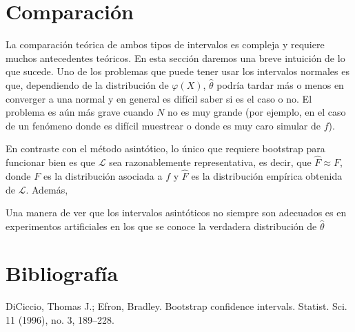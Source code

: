 \documentclass[11pt]{article}
\newcommand\LL{\mathcal{L}}
\begin{document}
\section*{Comparación}

La comparación teórica de ambos tipos de intervalos es compleja y requiere muchos antecedentes teóricos. En esta sección daremos una breve intuición de lo que sucede. Uno de los problemas que puede tener usar los intervalos normales es que, dependiendo de la distribución de $\varphi(X)$, $\hat\theta$ podría tardar más o menos en converger a una normal y en general es difícil saber si es el caso o no. El problema es aún más grave cuando $N$ no es muy grande (por ejemplo, en el caso de un fenómeno donde es difícil muestrear o donde es muy caro simular de $f$).

En contraste con el método asintótico, lo único que requiere bootstrap para funcionar bien es que $\LL$ sea razonablemente representativa, es decir, que $\hat{F} \approx F$, donde $F$ es la distribución asociada a $f$ y $\hat{F}$ es la distribución empírica obtenida de $\LL$. Además, 

Una manera de ver que los intervalos asintóticos no siempre son adecuados es en experimentos artificiales en los que se conoce la verdadera distribución de $\hat\theta$














\section*{Bibliografía}

DiCiccio, Thomas J.; Efron, Bradley. Bootstrap confidence intervals. 
 Statist. Sci. 11 (1996), no. 3, 189--228.
\end{document}

